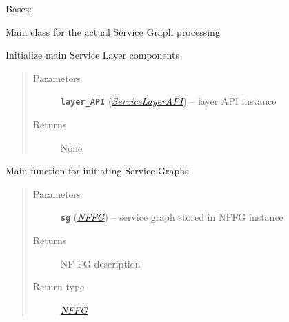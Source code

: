 \documentclass[letterpaper,10pt,english]{sphinxmanual}
\begin{document}
\begin{fulllineitems}
\label{service/sas_orchestration:escape.service.sas_orchestration.ServiceOrchestrator}
Bases: \href{https://docs.python.org/2.7/library/functions.html\#object}{}

Main class for the actual Service Graph processing

\begin{fulllineitems}
\label{service/sas_orchestration:escape.service.sas_orchestration.ServiceOrchestrator.__init__}
Initialize main Service Layer components
\begin{quote}\begin{description}
\item[{Parameters}] \leavevmode
\textbf{\texttt{layer\_API}} ({\hyperref[service/sas_API:escape.service.sas_API.ServiceLayerAPI]{\emph{\emph{ServiceLayerAPI}}}}) -- layer API instance

\item[{Returns}] \leavevmode
None

\end{description}\end{quote}

\end{fulllineitems}


\begin{fulllineitems}
\label{service/sas_orchestration:escape.service.sas_orchestration.ServiceOrchestrator.initiate_service_graph}
Main function for initiating Service Graphs
\begin{quote}\begin{description}
\item[{Parameters}] \leavevmode
\textbf{\texttt{sg}} ({\hyperref[util/nffg:escape.util.nffg.NFFG]{\emph{\emph{NFFG}}}}) -- service graph stored in NFFG instance

\item[{Returns}] \leavevmode
NF-FG description

\item[{Return type}] \leavevmode
{\hyperref[util/nffg:escape.util.nffg.NFFG]{\emph{NFFG}}}

\end{description}\end{quote}

\end{fulllineitems}


\end{fulllineitems}
\end{document}
